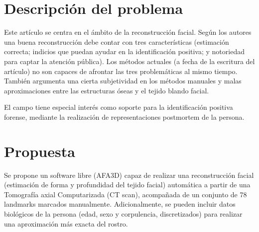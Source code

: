 \documentclass[13pt,a4paper]{article}
\begin{document}
    
    
    \tableofcontents
    \thispagestyle{empty}				%

    \newpage


\section{Descripción del problema}
Este artículo se centra en el ámbito de la reconstrucción facial. Según los autores una buena reconstrucción debe contar con tres características (estimación correcta; indicios que puedan ayudar en la identificación positiva; y notoriedad para captar la atención pública). Los métodos actuales (a fecha de la escritura del artículo) no son capaces de afrontar las tres problemáticas al mismo tiempo. También argumenta una cierta subjetividad en los métodos manuales y malas aproximaciones entre las estructuras óseas y el tejido blando facial.

El campo tiene especial interés como soporte para la identificación positiva forense, mediante la realización de representaciones postmortem de la persona.

\section{Propuesta}
Se propone un software libre (AFA3D) capaz de realizar una reconstrucción facial (estimación de forma y profundidad del tejido facial) automática a partir de una Tomografía axial Computarizada (CT scan), acompañada de un conjunto de 78 landmarks marcados manualmente. Adicionalmente, se pueden incluir datos biológicos de la persona (edad, sexo y corpulencia, discretizados) para realizar una aproximación más exacta del rostro.


\end{document}
